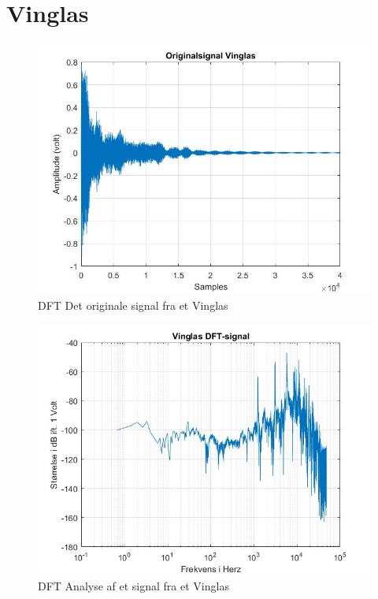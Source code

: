 \section{Vinglas}
\begin{figure}[ht!]
	\centering
	\includegraphics[width=180mm]{figures/Vinglas/original.jpg}
	\caption{DFT Det originale signal fra et Vinglas}
	\label{fig:Vinglas original}
\end{figure}

\begin{figure}[ht!]
	\centering
	\includegraphics[width=180mm]{figures/Vinglas/DFT.jpg}
	\caption{DFT Analyse af et signal fra et Vinglas}
	\label{fig:Vinglas DFT}
\end{figure}

